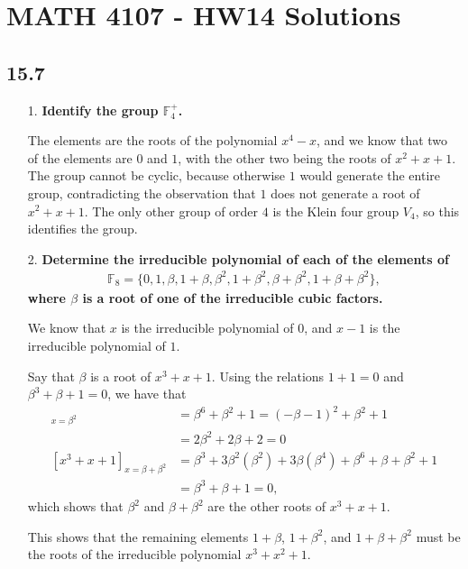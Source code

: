 \documentclass[a4paper,12pt]{article}
\begin{document}
\section*{MATH 4107 - HW14 Solutions}

\subsection*{15.7}
\begin{enumerate}
    \item[1.]
        \boldmath
        \textbf{Identify the group $\mathbb{F}_4^+$.} \par
        \unboldmath
        The elements are the roots of the polynomial $x^4 - x$, and we know that two of the elements are $0$ and $1$, with the other two being the roots of $x^2 + x + 1$. The group cannot be cyclic, because otherwise $1$ would generate the entire group, contradicting the observation that $1$ does not generate a root of $x^2 + x + 1$. The only other group of order $4$ is the Klein four group $V_4$, so this identifies the group.

    \item[2.]
        \boldmath
        \textbf{Determine the irreducible polynomial of each of the elements of
            \begin{align*}
                \mathbb{F}_8 = \{ 0, 1, \beta, 1 + \beta, \beta^2, 1 + \beta^2, \beta + \beta^2, 1 + \beta + \beta^2 \},
            \end{align*}
        where $\beta$ is a root of one of the irreducible cubic factors.} \par
        \unboldmath
        We know that $x$ is the irreducible polynomial of $0$, and $x - 1$ is the irreducible polynomial of $1$. \par
        Say that $\beta$ is a root of $x^3 + x + 1$. Using the relations $1 + 1 = 0$ and $\beta^3 + \beta + 1 = 0$, we have that
        \begin{align*}
            [ x^3 + x + 1 ]_{x = \beta^2} &= \beta^6 + \beta^2 + 1 = (-\beta - 1)^2 + \beta^2 + 1 \\
            &= 2\beta^2 + 2\beta + 2 = 0 \\
            [ x^3 + x + 1 ]_{x = \beta + \beta^2} &= \beta^3 + 3\beta^2(\beta^2) + 3\beta(\beta^4) + \beta^6 + \beta + \beta^2 + 1 \\
            &= \beta^3 + \beta + 1 = 0,
        \end{align*}
        which shows that $\beta^2$ and $\beta + \beta^2$ are the other roots of $x^3 + x + 1$. \par
        This shows that the remaining elements $1 + \beta$, $1 + \beta^2$, and $1 + \beta + \beta^2$ must be the roots of the irreducible polynomial $x^3 + x^2 + 1$.


\end{enumerate}
\end{document}
